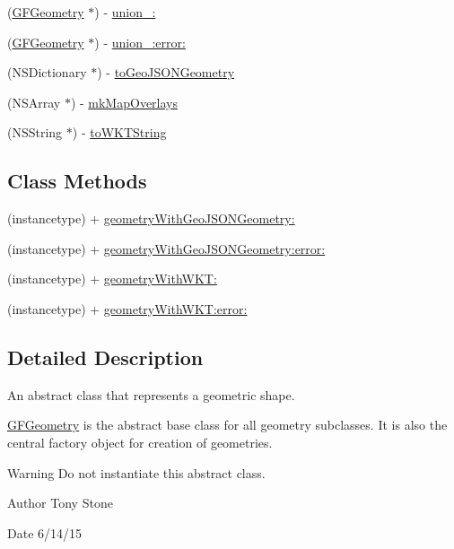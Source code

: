 \begin{DoxyCompactItemize}
\item 
(\hyperlink{interface_g_f_geometry}{G\+F\+Geometry} $\ast$) -\/ \hyperlink{interface_g_f_geometry_a58c32fcf4a3932281498d1a1b25fb46b}{union\+\_\+\+:}
\item 
(\hyperlink{interface_g_f_geometry}{G\+F\+Geometry} $\ast$) -\/ \hyperlink{interface_g_f_geometry_ac3fa56a053de364baf4b9c496b0b93a4}{union\+\_\+\+:error\+:}
\item 
(N\+S\+Dictionary $\ast$) -\/ \hyperlink{interface_g_f_geometry_a89a1dd53c1d9a51fd5b933fde28be5b7}{to\+Geo\+J\+S\+O\+N\+Geometry}
\item 
(N\+S\+Array $\ast$) -\/ \hyperlink{interface_g_f_geometry_a69a56e7786e1de09034c546ade1c7262}{mk\+Map\+Overlays}
\item 
(N\+S\+String $\ast$) -\/ \hyperlink{interface_g_f_geometry_a9d257cce05d031211e2cece24b5530e4}{to\+W\+K\+T\+String}
\end{DoxyCompactItemize}
\subsection*{Class Methods}
\begin{DoxyCompactItemize}
\item 
(instancetype) + \hyperlink{interface_g_f_geometry_a5b730dcea33fc8b2c156199400e3014e}{geometry\+With\+Geo\+J\+S\+O\+N\+Geometry\+:}
\item 
(instancetype) + \hyperlink{interface_g_f_geometry_ac665565535c19e73e6b7a696e8109586}{geometry\+With\+Geo\+J\+S\+O\+N\+Geometry\+:error\+:}
\item 
(instancetype) + \hyperlink{interface_g_f_geometry_a32a49e08fdbc2998735c26ddbfa88741}{geometry\+With\+W\+K\+T\+:}
\item 
(instancetype) + \hyperlink{interface_g_f_geometry_a04922dcfc9db4543970774b0457d487b}{geometry\+With\+W\+K\+T\+:error\+:}
\end{DoxyCompactItemize}


\subsection{Detailed Description}
An abstract class that represents a geometric shape. 

\hyperlink{interface_g_f_geometry}{G\+F\+Geometry} is the abstract base class for all geometry subclasses. It is also the central factory object for creation of geometries.

\begin{DoxyWarning}{Warning}
Do not instantiate this abstract class.
\end{DoxyWarning}
\begin{DoxyAuthor}{Author}
Tony Stone 
\end{DoxyAuthor}
\begin{DoxyDate}{Date}
6/14/15 
\end{DoxyDate}


